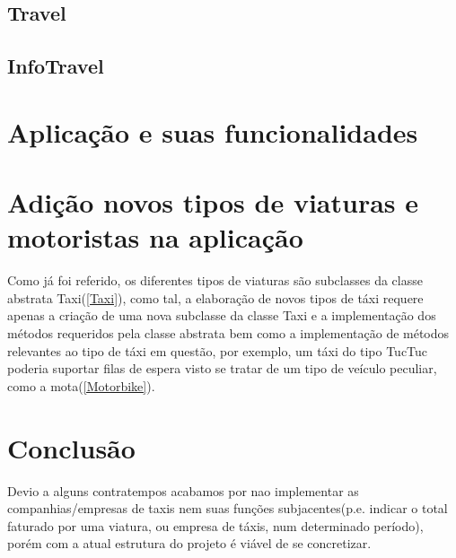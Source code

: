 \documentclass[a4paper,10pt,portuguese]{article}
\begin{document}
\subsection{Travel}
\subsection{InfoTravel}

\section{Aplicação e suas funcionalidades}

\section{Adição novos tipos de viaturas e motoristas na aplicação}
Como já foi referido, os diferentes tipos de viaturas são subclasses da classe abstrata Taxi(\ref{Taxi}), como tal, a elaboração de novos tipos de táxi requere apenas a criação de uma nova subclasse da classe Taxi e a implementação dos métodos requeridos pela classe abstrata bem como a implementação de métodos relevantes ao tipo de táxi em questão, por exemplo, um táxi do tipo TucTuc poderia suportar filas de espera visto se tratar de um tipo de veículo peculiar, como a mota(\ref{Motorbike}).

\newpage

\section{Conclusão}
Devio a alguns contratempos acabamos por nao implementar as companhias/empresas de taxis nem suas funções subjacentes(p.e. indicar o total faturado por uma viatura, ou empresa de táxis, num determinado período), porém com a atual estrutura do projeto é viável de se concretizar.
\end{document}
